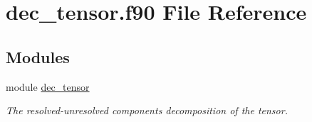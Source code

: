 \hypertarget{dec__tensor_8f90}{}\section{dec\+\_\+tensor.\+f90 File Reference}
\label{dec__tensor_8f90}
\subsection*{Modules}
\begin{DoxyCompactItemize}
\item 
module \hyperlink{namespacedec__tensor}{dec\+\_\+tensor}
\begin{DoxyCompactList}\small\item\em The resolved-\/unresolved components decomposition of the tensor. \end{DoxyCompactList}\end{DoxyCompactItemize}
